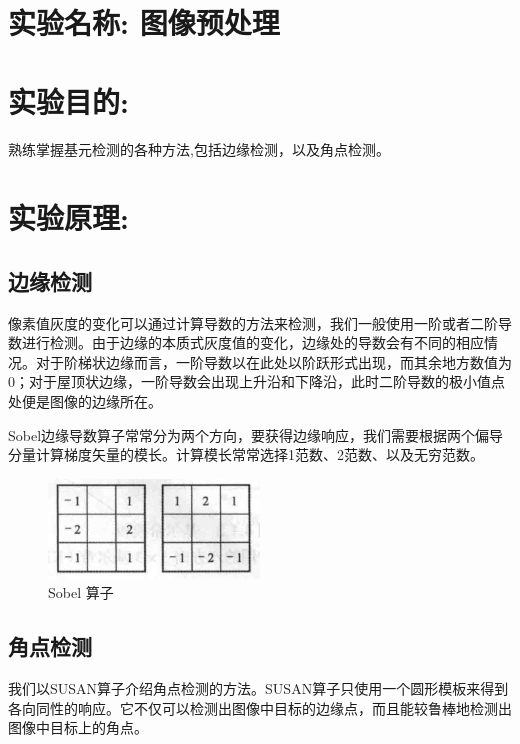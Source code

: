 \documentclass[a4paper,11pt,UTF8]{ctexart}
\begin{document}
\section{实验名称: 图像预处理}
\section{实验目的:}

熟练掌握基元检测的各种方法,包括边缘检测，以及角点检测。

\section{实验原理:}

\subsection{边缘检测}
像素值灰度的变化可以通过计算导数的方法来检测，我们一般使用一阶或者二阶导数进行检测。由于边缘的本质式灰度值的变化，边缘处的导数会有不同的相应情况。对于阶梯状边缘而言，一阶导数以在此处以阶跃形式出现，而其余地方数值为0；对于屋顶状边缘，一阶导数会出现上升沿和下降沿，此时二阶导数的极小值点处便是图像的边缘所在。

Sobel边缘导数算子常常分为两个方向，要获得边缘响应，我们需要根据两个偏导分量计算梯度矢量的模长。计算模长常常选择1范数、2范数、以及无穷范数。

\begin {figure}[h]
\centering %
\includegraphics[width=0.5\textwidth]{sobel.png}
\caption{Sobel 算子} %
\label{five}
\end {figure}

\subsection{角点检测}
我们以SUSAN算子介绍角点检测的方法。SUSAN算子只使用一个圆形模板来得到各向同性的响应。它不仅可以检测出图像中目标的边缘点，而且能较鲁棒地检测出图像中目标上的角点。
\end{document}
